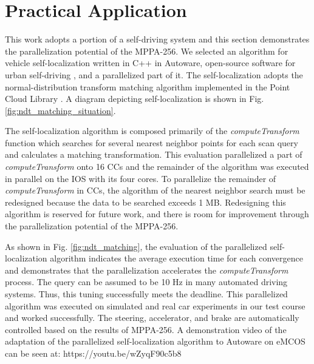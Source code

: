 \section{Practical Application}
\label{sec:practical_application}
This work adopts a portion of a self-driving system and this section demonstrates the parallelization potential of the MPPA-256.
We selected an algorithm for vehicle self-localization written in C++ in Autoware, open-source software for urban self-driving \cite{autoware}, and a parallelized part of it.
The self-localization adopts the normal-distribution transform matching algorithm \cite{magnusson2009three} implemented in the Point Cloud Library \cite{pcl}.
A diagram depicting self-localization is shown in Fig. \ref{fig:ndt_matching_situation}.


The self-localization algorithm is composed primarily of the \emph{computeTransform} function which searches for several nearest neighbor points for each scan query and calculates a matching transformation.
This evaluation parallelized a part of \emph{computeTransform} onto 16 CCs and the remainder of the algorithm was executed in parallel on the IOS with its four cores.
To parallelize the remainder of \emph{computeTransform} in CCs, the algorithm of the nearest neighbor search must be redesigned because the data to be searched exceeds 1 MB.
Redesigning this algorithm is reserved for future work, and there is room for improvement through the parallelization potential of the MPPA-256.

As shown in Fig. \ref{fig:ndt_matching}, the evaluation of the parallelized self-localization algorithm indicates the average execution time for each convergence and demonstrates that the parallelization accelerates the \emph{computeTransform} process.
The query can be assumed to be 10 Hz in many automated driving systems.
Thus, this tuning successfully meets the deadline.
This parallelized algorithm was executed on simulated and real car experiments in our test course and worked successfully.
The steering, accelerator, and brake are automatically controlled based on the results of MPPA-256.
A demonstration video of the adaptation of the parallelized self-localization algorithm to Autoware on eMCOS can be seen at: https://youtu.be/wZyqF90c5b8  

